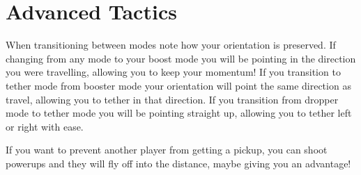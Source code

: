 \documentclass[10pt,a4paper]{article}
\begin{document}
\section{Advanced Tactics}

When transitioning between modes note how your orientation is preserved. If changing from any mode to your boost mode you will be pointing in the direction you were travelling, allowing you to keep your momentum! If you transition to tether mode from booster mode your orientation will point the same direction as travel, allowing you to tether in that direction. If you transition from dropper mode to tether mode you will be pointing straight up, allowing you to tether left or right with ease.

If you want to prevent another player from getting a pickup, you can shoot powerups and they will fly off into the distance, maybe giving you an advantage!
\end{document}
